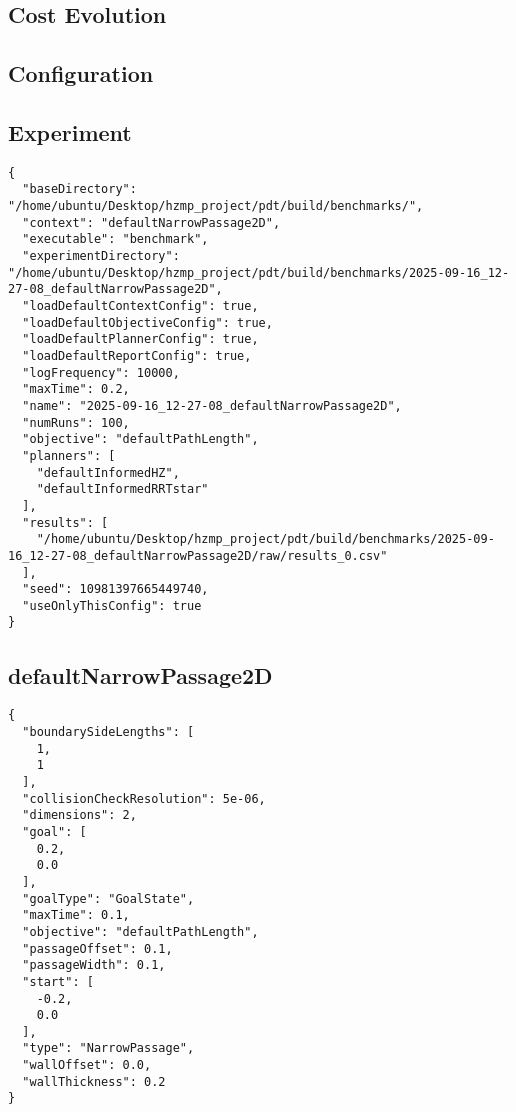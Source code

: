 \documentclass[titlepage]{article}
\begin{document}
\subsection{Cost Evolution}\label{sec:defaultInformedRRTstar-cost-evolution}
\begin{center}

\end{center}

\pagebreak
\begin{appendices}
\section{Configuration}\label{sec:configuration}
\subsection{Experiment}\label{sec:experiment-configuration}
\begin{lstlisting}
{
  "baseDirectory": "/home/ubuntu/Desktop/hzmp_project/pdt/build/benchmarks/",
  "context": "defaultNarrowPassage2D",
  "executable": "benchmark",
  "experimentDirectory": "/home/ubuntu/Desktop/hzmp_project/pdt/build/benchmarks/2025-09-16_12-27-08_defaultNarrowPassage2D",
  "loadDefaultContextConfig": true,
  "loadDefaultObjectiveConfig": true,
  "loadDefaultPlannerConfig": true,
  "loadDefaultReportConfig": true,
  "logFrequency": 10000,
  "maxTime": 0.2,
  "name": "2025-09-16_12-27-08_defaultNarrowPassage2D",
  "numRuns": 100,
  "objective": "defaultPathLength",
  "planners": [
    "defaultInformedHZ",
    "defaultInformedRRTstar"
  ],
  "results": [
    "/home/ubuntu/Desktop/hzmp_project/pdt/build/benchmarks/2025-09-16_12-27-08_defaultNarrowPassage2D/raw/results_0.csv"
  ],
  "seed": 10981397665449740,
  "useOnlyThisConfig": true
}\end{lstlisting}
\subsection{defaultNarrowPassage2D}\label{sec:context-configuration}
\begin{lstlisting}
{
  "boundarySideLengths": [
    1,
    1
  ],
  "collisionCheckResolution": 5e-06,
  "dimensions": 2,
  "goal": [
    0.2,
    0.0
  ],
  "goalType": "GoalState",
  "maxTime": 0.1,
  "objective": "defaultPathLength",
  "passageOffset": 0.1,
  "passageWidth": 0.1,
  "start": [
    -0.2,
    0.0
  ],
  "type": "NarrowPassage",
  "wallOffset": 0.0,
  "wallThickness": 0.2
}\end{lstlisting}

\end{appendices}
\end{document}
